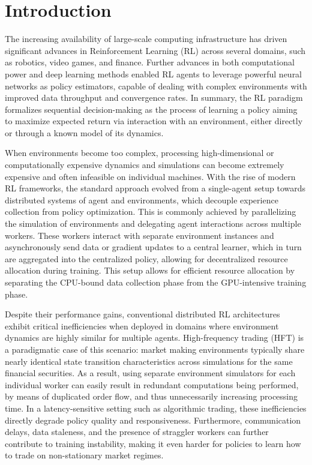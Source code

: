 
\chapter{Introduction}
\label{ch:introduction}

The increasing availability of large-scale computing infrastructure has driven significant advances
in Reinforcement Learning (RL) across several domains, such as robotics, video games, and finance.
Further advances in both computational power and deep learning methods enabled RL agents to leverage powerful neural networks
as policy estimators, capable of dealing with complex environments with improved data throughput and convergence rates.
In summary, the RL paradigm formalizes sequential decision-making as the process of learning a policy aiming to maximize expected return
via interaction with an environment, either directly or through a known model of its dynamics.

When environments become too complex, processing high-dimensional or computationally expensive dynamics and simulations
can become extremely expensive and often infeasible on individual machines.
With the rise of modern RL frameworks, the standard approach evolved from a single-agent setup towards
distributed systems of agent and environments, which decouple experience collection from policy optimization.
This is commonly achieved by parallelizing the simulation of environments and delegating agent interactions across multiple workers.
These workers interact with separate environment instances and asynchronously send data or gradient updates to a central learner,
which in turn are aggregated into the centralized policy, allowing for decentralized resource allocation during training.
This setup allows for efficient resource allocation by separating the CPU-bound data collection phase from the GPU-intensive training phase.

Despite their performance gains, conventional distributed RL architectures exhibit critical inefficiencies when
deployed in domains where environment dynamics are highly similar for multiple agents.
High-frequency trading (HFT) is a paradigmatic case of this scenario: market making environments typically share nearly
identical state transition characteristics across simulations for the same financial securities.
As a result, using separate environment simulators for each individual worker can easily result in redundant computations being performed,
by means of duplicated order flow, and thus unnecessarily increasing processing time.
In a latency-sensitive setting such as algorithmic trading, these inefficiencies directly degrade policy quality and responsiveness.
Furthermore, communication delays, data staleness, and the presence of straggler workers can further contribute to training instability,
making it even harder for policies to learn how to trade on non-stationary market regimes.

